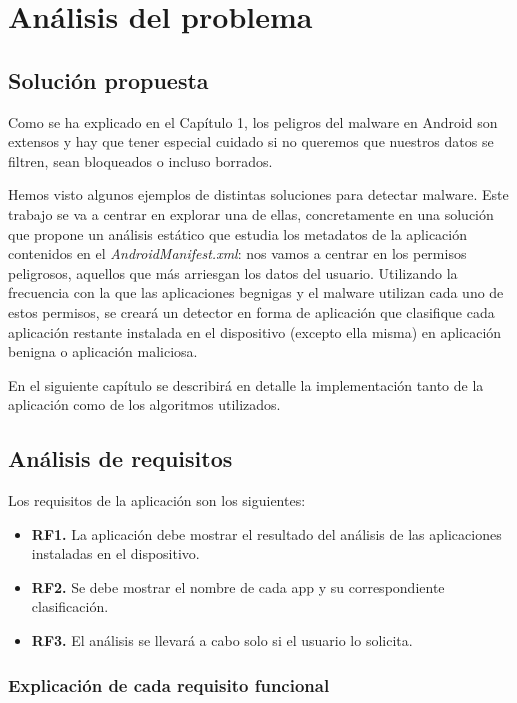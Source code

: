 \chapter{Análisis del problema}

\section{Solución propuesta}

Como se ha explicado en el Capítulo 1, los peligros del malware en Android son extensos y hay que tener especial cuidado si no queremos que nuestros datos se filtren, sean bloqueados o incluso borrados.

Hemos visto algunos ejemplos de distintas soluciones para detectar malware. Este trabajo se va a centrar en explorar una de ellas, concretamente en una solución que propone un análisis estático que estudia los metadatos de la aplicación contenidos en el \textit{AndroidManifest.xml}: nos vamos a centrar en los permisos peligrosos, aquellos que más arriesgan los datos del usuario. Utilizando la frecuencia con la que las aplicaciones begnigas y el malware utilizan cada uno de estos permisos, se creará un detector en forma de aplicación que clasifique cada aplicación restante instalada en el dispositivo (excepto ella misma) en aplicación benigna o aplicación maliciosa.

En el siguiente capítulo se describirá en detalle la implementación tanto de la aplicación como de los algoritmos utilizados.
 
\section{Análisis de requisitos}

Los requisitos de la aplicación son los siguientes:

\begin{itemize}
	\item \textbf{RF1.} La aplicación debe mostrar el resultado del análisis de las aplicaciones instaladas en el dispositivo.
	\item \textbf{RF2.} Se debe mostrar el nombre de cada app y su correspondiente clasificación.
	\item \textbf{RF3.} El análisis se llevará a cabo solo si el usuario lo solicita.
\end{itemize}

\subsection{Explicación de cada requisito funcional}

